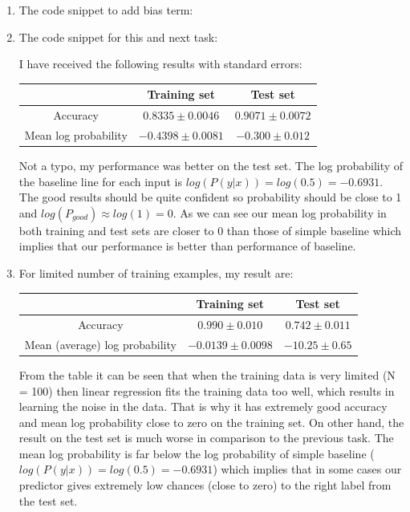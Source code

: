 \documentclass{article}
\begin{document}
				\begin{enumerate}[label=(\alph*)]
					\item 
						The code snippet to add bias term:
						
					\item
						The code snippet for this and next task:
						
						I have received the following results with standard errors:
						\begin{center}
							\begin{tabular}{| c | c | c |}
								\hline
								\, &  Training set & Test set \\ \hline
								Accuracy & $0.8335 \pm 0.0046$ & $0.9071 \pm 0.0072$ \\ \hline
								Mean log probability & $-0.4398 \pm 0.0081 $ & $-0.300 \pm 0.012 $\\
								\hline
							\end{tabular}
						\end{center}
						Not a typo, my performance was better on the test set. The log probability of the baseline line for each input is $log(P(y | x)) = log(0.5) = -0.6931$. The good results should be quite confident so probability should be close to 1 and $log(P_{good}) \approx log(1) = 0$. As we can see our mean log probability in both training and test sets are closer to 0 than those of simple baseline which implies that our performance is better than performance of baseline.
						
					\item
						For limited number of training examples, my result are:
						\begin{center}
							\begin{tabular}{| c | c | c |}
								\hline
								\, &  Training set & Test set \\ \hline
								Accuracy & $0.990 \pm 0.010 $ & $0.742 \pm 0.011$ \\ \hline
								Mean (average) log probability & $-0.0139 \pm 0.0098$ & $-10.25 \pm 0.65 $\\
								\hline
							\end{tabular}
						\end{center}
						From the table it can be seen that when the training data is very limited (N = 100) then linear regression fits the training data too well, which results in learning the noise in the data. That is why it has extremely good accuracy and mean log probability close to zero on the training set. On other hand, the result on the test set is much worse in comparison to the previous task.  The mean log probability is far below the log probability of simple baseline ($log(P(y | x)) = log(0.5) = -0.6931$) which implies that in some cases our predictor gives extremely low chances (close to zero) to the right label from the test set.
				\end{enumerate}
\end{document}
